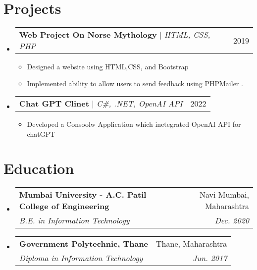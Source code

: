 \documentclass[letterpaper,11pt]{article}
\makeatletter
\newcommand{\resumeItem}[1]{
  \item\small{
    {#1 \vspace{-2pt}}
  }
}
\newcommand{\resumeSubheading}[4]{
  \vspace{-2pt}\item
    \begin{tabular*}{0.97\textwidth}[t]{l@{\extracolsep{\fill}}r}
      \textbf{#1} & #2 \\
      \textit{\small#3} & \textit{\small #4} \\
    \end{tabular*}\vspace{-7pt}
}
\newcommand{\resumeProjectHeading}[2]{
    \item
    \begin{tabular*}{0.97\textwidth}{l@{\extracolsep{\fill}}r}
      \small#1 & #2 \\
    \end{tabular*}\vspace{-7pt}
}
\newcommand{\resumeSubHeadingListStart}{\begin{itemize}[leftmargin=0.15in, label={}]}
\newcommand{\resumeSubHeadingListEnd}{\end{itemize}}
\newcommand{\resumeItemListStart}{\begin{itemize}}
\newcommand{\resumeItemListEnd}{\end{itemize}\vspace{-5pt}}
\makeatother
\begin{document}
\section{Projects}
    \resumeSubHeadingListStart
      \resumeProjectHeading
          {\textbf{Web Project On Norse Mythology} $|$ \emph{HTML, CSS, PHP}}{2019}
          \resumeItemListStart
            \resumeItem{Designed a website using HTML,CSS, and Bootstrap}
            \resumeItem{Implemented ability to allow users to send feedback using PHPMailer .}
          \resumeItemListEnd
      \resumeProjectHeading
          {\textbf{Chat GPT Clinet } $|$ \emph{C\#, .NET, OpenAI API}}{2022}
          \resumeItemListStart
            \resumeItem{Developed a Consoolw Application which inetegrated OpenAI API for chatGPT }
          \resumeItemListEnd
    \resumeSubHeadingListEnd



%

\section{Education}
  \resumeSubHeadingListStart
    \resumeSubheading
      {Mumbai University  - A.C. Patil College of Engineering}{Navi Mumbai, Maharashtra}
      {B.E. in Information Technology }{Dec. 2020}
    \resumeSubheading
      {Government Polytechnic, Thane }{Thane, Maharashtra}
      {Diploma in Information Technology}{Jun. 2017}
  \resumeSubHeadingListEnd


\end{document}
